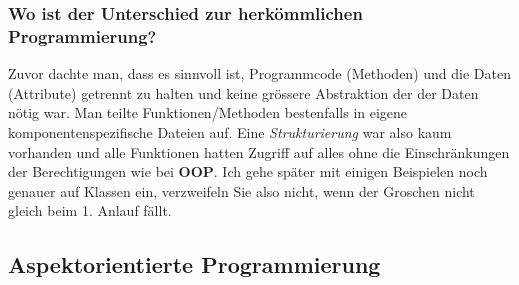\documentclass[b5paper,10pt,dvips,fleqn,titlepage,twoside]{book}
\begin{document}
\subsubsection{Wo ist der Unterschied zur herkömmlichen Programmierung?}
Zuvor dachte man, dass es sinnvoll ist, Programmcode (Methoden) und die Daten (Attribute) getrennt zu halten und keine grössere Abstraktion der der Daten nötig war. Man teilte Funktionen/Methoden bestenfalls in eigene komponentenspezifische Dateien auf. Eine \emph{Strukturierung} war also kaum vorhanden und alle Funktionen hatten Zugriff auf alles ohne die Einschränkungen der Berechtigungen wie bei \textbf{OOP}.
\newline\newline
Ich gehe später mit einigen Beispielen noch genauer auf Klassen ein, verzweifeln Sie also nicht, wenn der Groschen nicht gleich beim 1. Anlauf fällt.
\subsection{Aspektorientierte Programmierung}
\end{document}
